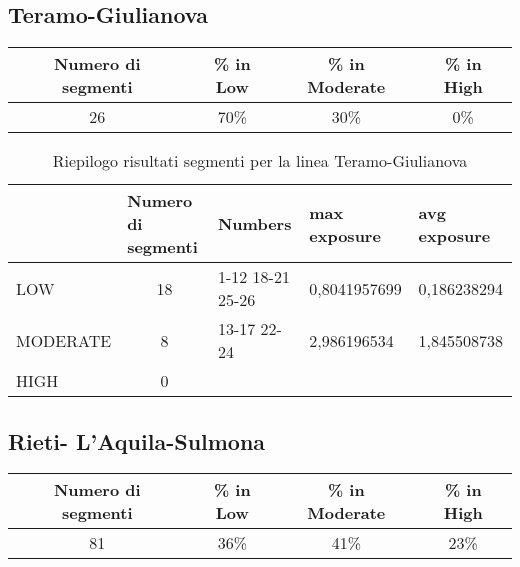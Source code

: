 \subsection{Teramo-Giulianova}
\label{app:giulianovateramo}
\centering
\begin{tabular}  {|c|c|c|c|} 
	
	\hline 
	Numero di segmenti  & \% in Low & \% in Moderate & \% in High \\ 
	\hline 
	26  & 70\% & 30\% & 0\% \\ 
	\hline 
\end{tabular} 
\begin{table}[bh]
	\centering
	\caption{Riepilogo risultati segmenti per la linea Teramo-Giulianova}
	\label{my-label}
	\begin{tabular}{|l|c|l|l|l|}
		\hline
		& \multicolumn{1}{l|}{Numero di segmenti} & Numbers          & max exposure & avg exposure \\ \hline
		LOW      & 18                                      & 1-12 18-21 25-26 & 0,8041957699 & 0,186238294  \\ \hline
		MODERATE & 8                                       & 13-17 22-24      & 2,986196534  & 1,845508738  \\ \hline
		HIGH     & 0                                       &                  &              &              \\ \hline
	\end{tabular}
\end{table}
\newpage





\subsection{Rieti- L'Aquila-Sulmona}
\label{app:sulmonarieti}
\centering
\begin{tabular}  {|c|c|c|c|} 
	
	\hline 
	Numero di segmenti  & \% in Low & \% in Moderate & \% in High \\ 
	\hline 
	81  & 36\% & 41\% & 23\% \\ 
	\hline 
\end{tabular} 

